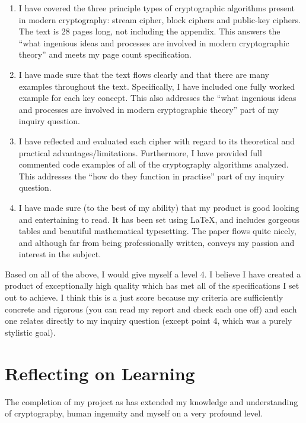 \documentclass[12pt, a4paper, final]{report}
\begin{document}
\begin{enumerate}
\item I have covered the three principle types of cryptographic algorithms
present in modern cryptography: stream cipher, block ciphers and public-key
ciphers. The text is 28 pages long, not including the appendix. This answers
the ``what ingenious ideas and processes are involved in modern cryptographic
theory'' and meets my page count specification.

\item I have made sure that the text flows clearly and that there are many
examples throughout the text. Specifically, I have included one fully worked
example for each key concept. This also addresses the ``what ingenious ideas
and processes are involved in modern cryptographic theory'' part of my inquiry
question.

\item I have reflected and evaluated each cipher with regard to its theoretical
and practical advantages/limitations. Furthermore, I have provided full commented
code examples of all of the cryptography algorithms analyzed. This addresses
the ``how do they function in practise'' part of my inquiry question.

\item I have made sure (to the best of my ability) that my product is good
looking and entertaining to read. It has been set using {\LaTeX}, and includes
gorgeous tables and beautiful mathematical typesetting. The paper flows quite
nicely, and although far from being professionally written, conveys my passion
and interest in the subject.
\end{enumerate}

Based on all of the above, I would give myself a level 4. I believe I have
created a product of exceptionally high quality which has met all of the
specifications I set out to achieve. I think this is a just score because my
criteria are sufficiently concrete and rigorous (you can read my report and
check each one off) and each one relates directly to my inquiry question
(except point 4, which was a purely stylistic goal).

\section*{Reflecting on Learning}

The completion of my project as has extended my knowledge and understanding of
cryptography, human ingenuity and myself on a very profound level.
\end{document}
